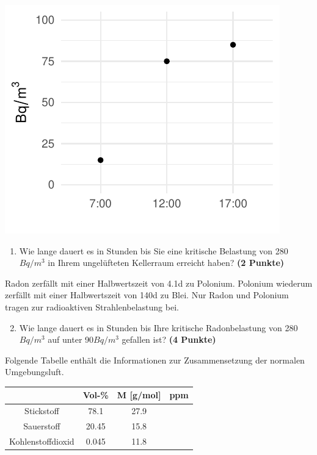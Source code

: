 \documentclass[a4paper, 9pt]{scrartcl}\usepackage[]{graphicx}\usepackage[]{xcolor}
\makeatletter
\def\maxwidth{ %
  \ifdim\Gin@nat@width>\linewidth
    \linewidth
  \else
    \Gin@nat@width
  \fi
}
\newenvironment{knitrout}{}{} %
\makeatother
\begin{document}
\begin{knitrout}
\color{fgcolor}

{\centering \includegraphics[width=\maxwidth]{img/math-10-1} 

}


\end{knitrout}

\vspace{-0.75cm}

\begin{enumerate}
\item Wie lange dauert es in Stunden bis Sie eine kritische Belastung von
  280$Bq/m^3$ in Ihrem ungelüfteten Kellerraum erreicht haben?
  \textbf{(2 Punkte)}
\end{enumerate}

Radon zerfällt mit einer Halbwertszeit von 4.1d zu
Polonium. Polonium wiederum zerfällt mit einer Halbwertszeit von
140d zu Blei. Nur Radon und Polonium tragen zur
radioaktiven Strahlenbelastung bei.

\begin{enumerate}
  \setcounter{enumi}{1}
\item Wie lange dauert es in Stunden bis Ihre kritische Radonbelastung von
  280$Bq/m^3$ auf unter 90$Bq/m^3$ gefallen ist?
  \textbf{(4 Punkte)}
\end{enumerate}

Folgende Tabelle enthält die Informationen zur Zusammensetzung der
normalen Umgebungsluft.

\begin{center}
  \begin{tabular}{ c|c|c|c }
     & Vol-\% & M [g/mol] & ppm \\
    \hline
    Stickstoff & 78.1 & 27.9 &
                                                    \phantom{1000000000000}\strut\\
        \hline
    Sauerstoff & 20.45 & 15.8 &
                                                    \phantom{10000000}\strut\\
        \hline
    Kohlenstoffdioxid & 0.045 & 11.8 & \phantom{10000000}\strut\\     
     \hline
\end{tabular}
\end{center}
\end{document}
